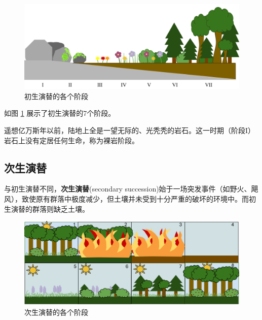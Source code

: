 \begin{figure}[htbp]
    \centering
    \includegraphics[width=400pt]{images/primary-succession.png}
    \caption{初生演替的各个阶段}
    \label{fig:primary-succession}
\end{figure}

如图 \ref{fig:primary-succession} 展示了初生演替的7个阶段。

遥想亿万斯年以前，陆地上全是一望无际的、光秃秃的岩石。这一时期（阶段I）岩石上没有定居任何生命，称为裸岩阶段。

\subsection{次生演替}
与初生演替不同，\textbf{次生演替}(secondary succession)始于一场突发事件（如野火、飓风），致使原有群落中极度减少，但土壤并未受到十分严重的破坏的环境中。而初生演替的群落则缺乏土壤。

\begin{figure}[htbp]
    \centering
    \includegraphics[width=400pt]{images/secondary-succession.png}
    \caption{次生演替的各个阶段}
    \label{fig:secondary-succession}
\end{figure}
